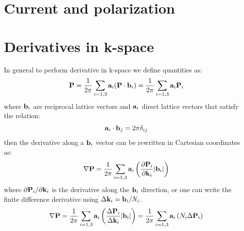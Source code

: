 \documentclass[preprint,showpacs,prb,superscriptaddress,aps,floatfix]{revtex4-1}
\newcommand{\ab}{{\bf a}}
\newcommand{\bb}{{\bf b}}
\newcommand{\PP}{{\bf P}}
\newcommand{\kk}{{\bf k}}
\newcommand{\be}{\begin{equation}}
\newcommand{\ee}{\end{equation}}
\renewcommand{\[}{\left[}
\renewcommand{\]}{\right]}
\renewcommand{\(}{\left(}
\renewcommand{\)}{\right)}
\begin{document}
\section{Current and polarization}	

\appendix
\section{Derivatives in k-space}
In general to perform derivative in k-space we define quantities as:
\be
\PP = \frac{1}{2\pi} \sum_{i=1,3} \ab_i (\PP \cdot \bb_i) = \frac{1}{2\pi} \sum_{i=1,3} \ab_i \PP_i
\ee
where $\bb_i$ are reciprocal lattice vectors and $\ab_i$ direct lattice vectors that satisfy the relation:
\be
\ab_i \cdot \bb_j = 2\pi\delta_{ij}
\ee
then the derivative along a $\bb_i$ vector can be rewritten in Cartesian coordinates as:
\be
\nabla \PP = \frac{1}{2\pi} \sum_{i=1,3} \ab_i \left( \frac{\partial \PP_i}{\partial \kk_i} |\bb_i| \right)
\ee 
where $\partial \PP_i/\partial \kk_i$ is the derivative along the $\bb_i$ direction, or one can write the finite difference derivative using $\Delta \kk_i = \bb_i/N_i$.
\be
\nabla \PP = \frac{1}{2\pi} \sum_{i=1,3} \ab_i \left( \frac{\Delta \PP_i}{\Delta \kk_i}  |\bb_i|  \right) = \frac{1}{2\pi} \sum_{i=1,3} \ab_i \left( N_i \Delta \PP_i \right)
\ee 



\end{document}
